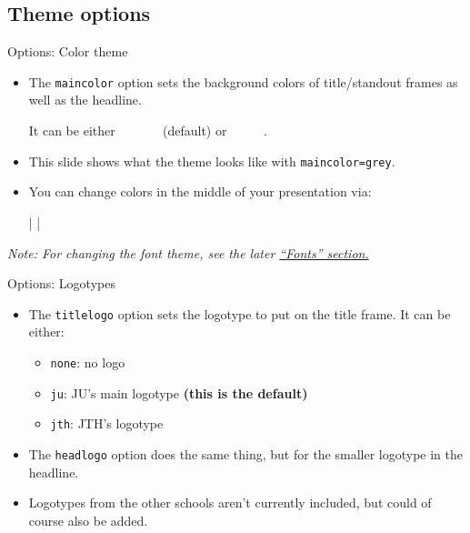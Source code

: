 \documentclass[10pt]{beamer}
\begin{document}
\subsection{Theme options}

{
\begin{frame}[fragile,stretch=3]{Options: Color theme}

    \begin{itemize}
    \item The \texttt{maincolor} option sets the background colors of title/standout frames as well as the      headline.\medskip
    
    It can be either \colorbox{juPurple}{\textcolor{white}{\texttt{purple}}} (default) or \colorbox{juGrey}{\textcolor{white}{\texttt{grey{\vphantom l}}}}.

    \item This slide shows what the theme looks like with \texttt{maincolor=grey}.
  
    \item You can change colors in the middle of your presentation via:\medskip

          |   |
    \end{itemize}
    
    \medskip
    \textit{Note: For changing the font theme, see the later \hyperlink{selectfonts}{\textcolor{juDarkBlue}{``Fonts'' section.}}}
\end{frame}
}

\begin{frame}[stretch]{Options: Logotypes}
  \begin{itemize}
    \item The \texttt{titlelogo} option sets the logotype to put on the title frame.  It can be either:
    \begin{itemize}
        \item \texttt{none}: no logo
        \item \texttt{ju}: JU's main logotype \alert{\bf (this is the default)}
        \item \texttt{jth}: JTH's logotype
    \end{itemize}
    \item The \texttt{headlogo} option does the same thing, but for the smaller logotype in the headline.
    \item Logotypes from the other schools aren't currently included, but could of course also be added.
  \end{itemize}
\end{frame}
\end{document}
